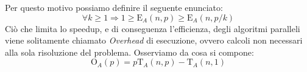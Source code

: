 Per questo motivo possiamo definire il seguente enunciato:
\begin{equation}
\forall k \geq 1 \Rightarrow { } 1 \geq \mathrm{E}_{A}(n, p) \geq \mathrm{E}_{A}(n, p/k)
\end{equation}
Ciò che limita lo speedup, e di conseguenza l'efficienza, degli algoritmi paralleli viene solitamente chiamato \textit{Overhead} di esecuzione, ovvero calcoli non necessari alla sola risoluzione del problema.
Osserviamo da cosa si compone:
\begin{equation}
\mathrm{O}_{A}(p) = p\mathrm{T}_{A}(n, p) - \mathrm{T}_{A}(n,1) 
\end{equation}


